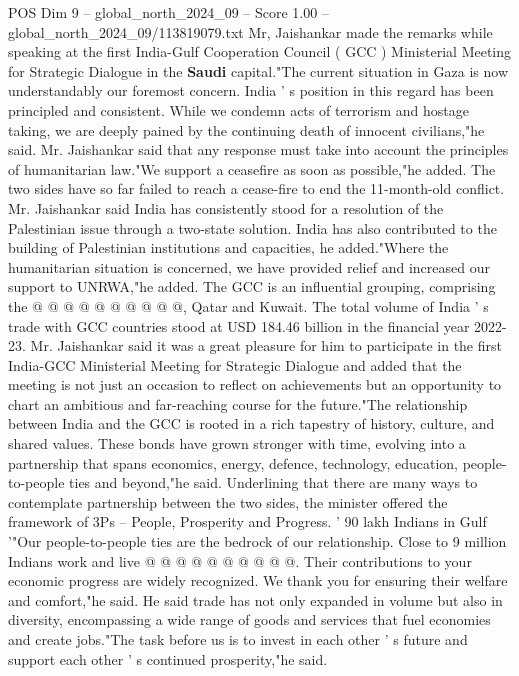 \begin{textsample}{POS Dim 9 – global\_north\_2024\_09 – Score 1.00 – global\_north\_2024\_09/113819079.txt}  \label{ex:f9_pos_430}
Mr, Jaishankar made the remarks while speaking at the first India-Gulf Cooperation Council ( GCC ) Ministerial Meeting for Strategic Dialogue in the \textbf{Saudi} capital."The current situation in Gaza is now understandably our foremost concern.
India ' s position in this regard has been principled and consistent.
While we condemn acts of terrorism and hostage taking, we are deeply pained by the continuing death of innocent civilians,"he said.
Mr.
Jaishankar said that any response must take into account the principles of humanitarian law."We support a ceasefire as soon as possible,"he added.
The two sides have so far failed to reach a cease-fire to end the 11-month-old conflict.
Mr.
Jaishankar said India has consistently stood for a resolution of the Palestinian issue through a two-state solution.
India has also contributed to the building of Palestinian institutions and capacities, he added."Where the humanitarian situation is concerned, we have provided relief and increased our support to UNRWA,"he added.
The GCC is an influential grouping, comprising the @ @ @ @ @ @ @ @ @ @, Qatar and Kuwait.
The total volume of India ' s trade with GCC countries stood at USD 184.46 billion in the financial year 2022-23.
Mr.
Jaishankar said it was a great pleasure for him to participate in the first India-GCC Ministerial Meeting for Strategic Dialogue and added that the meeting is not just an occasion to reflect on achievements but an opportunity to chart an ambitious and far-reaching course for the future."The relationship between India and the GCC is rooted in a rich tapestry of history, culture, and shared values.
These bonds have grown stronger with time, evolving into a partnership that spans economics, energy, defence, technology, education, people-to-people ties and beyond,"he said.
Underlining that there are many ways to contemplate partnership between the two sides, the minister offered the framework of 3Ps -- People, Prosperity and Progress. ' 90 lakh Indians in Gulf '"Our people-to-people ties are the bedrock of our relationship.
Close to 9 million Indians work and live @ @ @ @ @ @ @ @ @ @.
Their contributions to your economic progress are widely recognized.
We thank you for ensuring their welfare and comfort,"he said.
He said trade has not only expanded in volume but also in diversity, encompassing a wide range of goods and services that fuel economies and create jobs."The task before us is to invest in each other ' s future and support each other ' s continued prosperity,"he said.

\end{textsample}
